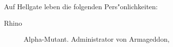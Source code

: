 
Auf Hellgate leben die folgenden Pers"onlichkeiten: 

\begin{description}    
    \item[Rhino] Alpha-Mutant. Administrator von Armageddon,
\end{description}
